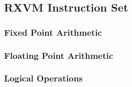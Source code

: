 

\subsection{RXVM Instruction Set}

\subsubsection{Fixed Point Arithmetic}

\subsubsection{Floating Point Arithmetic}

\subsubsection{Logical Operations}

